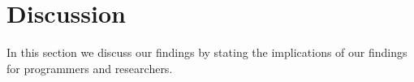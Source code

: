 \documentclass[conference]{IEEEtran}
\begin{document}
\section{Discussion}
\label{discussion}
In this section we discuss our findings by stating the implications of our findings for programmers and researchers.  


\begin{itemize}

\begin{item}


\vspace{0.50em}
     
\end{item}
\vspace{0.50em}


\begin{item}

\vspace{0.50em}
     
\end{item}
\vspace{0.50em}


\begin{item}
 


\vspace{0.50em}
     
\end{item}
\vspace{0.50em}


\end{itemize}
\end{document}
